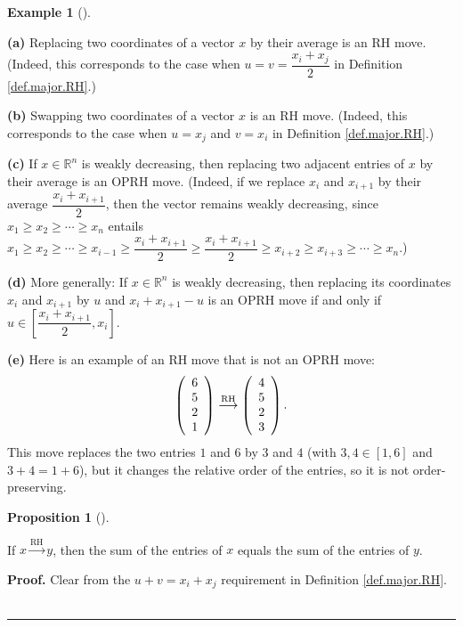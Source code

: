 \documentclass[numbers=enddot,12pt,final,onecolumn,notitlepage]{scrartcl}%
\numberwithin{exer}{subsection}
\theoremstyle{definition}
\newtheorem{prop}[theo]{Proposition}
\newenvironment{proposition}[1][]
{\begin{prop}[#1]\begin{leftbar}}
{\end{leftbar}\end{prop}}
\newtheorem{exam}[theo]{Example}
\newenvironment{example}[1][]
{\begin{exam}[#1]\begin{leftbar}}
{\end{leftbar}\end{exam}}
\newenvironment{proof}[1][Proof]{\noindent\textbf{#1.} }{\ \rule{0.5em}{0.5em}}
\begin{document}
\begin{example}
\textbf{(a)} Replacing two coordinates of a vector $x$ by their average is an
RH move. (Indeed, this corresponds to the case when $u=v=\dfrac{x_{i}+x_{j}%
}{2}$ in Definition \ref{def.major.RH}.) \medskip

\textbf{(b)} Swapping two coordinates of a vector $x$ is an RH move. (Indeed,
this corresponds to the case when $u=x_{j}$ and $v=x_{i}$ in Definition
\ref{def.major.RH}.) \medskip

\textbf{(c)} If $x\in\mathbb{R}^{n}$ is weakly decreasing, then replacing two
adjacent entries of $x$ by their average is an OPRH move. (Indeed, if we
replace $x_{i}$ and $x_{i+1}$ by their average $\dfrac{x_{i}+x_{i+1}}{2}$,
then the vector remains weakly decreasing, since $x_{1}\geq x_{2}\geq
\cdots\geq x_{n}$ entails $x_{1}\geq x_{2}\geq\cdots\geq x_{i-1}\geq
\dfrac{x_{i}+x_{i+1}}{2}\geq\dfrac{x_{i}+x_{i+1}}{2}\geq x_{i+2}\geq
x_{i+3}\geq\cdots\geq x_{n}$.) \medskip

\textbf{(d)} More generally: If $x\in\mathbb{R}^{n}$ is weakly decreasing,
then replacing its coordinates $x_{i}$ and $x_{i+1}$ by $u$ and $x_{i}%
+x_{i+1}-u$ is an OPRH move if and only if $u\in\left[  \dfrac{x_{i}+x_{i+1}%
}{2},x_{i}\right]  $. \medskip

\textbf{(e)} Here is an example of an RH move that is not an OPRH move:%
\[
\left(
\begin{array}
[c]{c}%
6\\
5\\
2\\
1
\end{array}
\right)  \overset{\text{RH}}{\longrightarrow}\left(
\begin{array}
[c]{c}%
4\\
5\\
2\\
3
\end{array}
\right)  .
\]
This move replaces the two entries $1$ and $6$ by $3$ and $4$ (with
$3,4\in\left[  1,6\right]  $ and $3+4=1+6$), but it changes the relative order
of the entries, so it is not order-preserving.
\end{example}

\begin{proposition}
\label{prop.major.RH.sum-equals}If $x\overset{\text{RH}}{\longrightarrow}y$,
then the sum of the entries of $x$ equals the sum of the entries of $y$.
\end{proposition}

\begin{proof}
Clear from the $u+v=x_{i}+x_{j}$ requirement in Definition \ref{def.major.RH}.
\end{proof}
\end{document}
